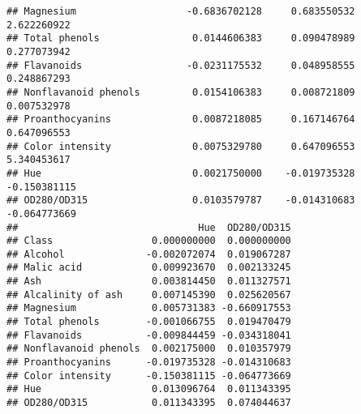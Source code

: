 \documentclass[
]{article}
\begin{document}
\begin{verbatim}
## Magnesium                   -0.6836702128     0.683550532     2.622260922
## Total phenols                0.0144606383     0.090478989     0.277073942
## Flavanoids                  -0.0231175532     0.048958555     0.248867293
## Nonflavanoid phenols         0.0154106383     0.008721809     0.007532978
## Proanthocyanins              0.0087218085     0.167146764     0.647096553
## Color intensity              0.0075329780     0.647096553     5.340453617
## Hue                          0.0021750000    -0.019735328    -0.150381115
## OD280/OD315                  0.0103579787    -0.014310683    -0.064773669
##                               Hue  OD280/OD315
## Class                 0.000000000  0.000000000
## Alcohol              -0.002072074  0.019067287
## Malic acid            0.009923670  0.002133245
## Ash                   0.003814450  0.011327571
## Alcalinity of ash     0.007145390  0.025620567
## Magnesium             0.005731383 -0.660917553
## Total phenols        -0.001066755  0.019470479
## Flavanoids           -0.009844459 -0.034318041
## Nonflavanoid phenols  0.002175000  0.010357979
## Proanthocyanins      -0.019735328 -0.014310683
## Color intensity      -0.150381115 -0.064773669
## Hue                   0.013096764  0.011343395
## OD280/OD315           0.011343395  0.074044637
\end{verbatim}
\end{document}
